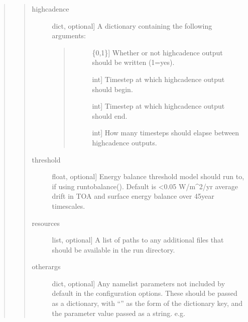 \documentclass[letterpaper,10pt,english]{sphinxmanual}
\begin{document}
\begin{fulllineitems}
\begin{fulllineitems}
\begin{quote}
\begin{quote}
\begin{description}
\item[{highcadence}] \leavevmode{[}dict, optional{]}
A dictionary containing the following arguments:
\begin{quote}
\begin{description}
\item[{}] \leavevmode{[}\{0,1\}{]}
Whether or not high\sphinxhyphen{}cadence output should be written (1=yes).

\item[{}] \leavevmode{[}int{]}
Timestep at which high\sphinxhyphen{}cadence output should begin.

\item[{}] \leavevmode{[}int{]}
Timestep at which high\sphinxhyphen{}cadence output should end.

\item[{}] \leavevmode{[}int{]}
How many timesteps should elapse between high\sphinxhyphen{}cadence outputs.

\end{description}
\end{quote}

\item[{threshold}] \leavevmode{[}float, optional{]}
Energy balance threshold model should run to, if using runtobalance().
Default is \textless{}0.05 W/m\textasciicircum{}2/yr average drift in TOA and surface energy balance
over 45\sphinxhyphen{}year timescales.

\item[{resources}] \leavevmode{[}list, optional{]}
A list of paths to any additional files that should be available in the
run directory.

\item[{otherargs}] \leavevmode{[}dict, optional{]}
Any namelist parameters not included by default in the configuration options.
These should be passed as a dictionary, with “” as the
form of the dictionary key, and the parameter value passed as a string.
e.g. 

\end{description}
\end{quote}


\end{quote}
\end{fulllineitems}
\end{fulllineitems}
\end{document}
